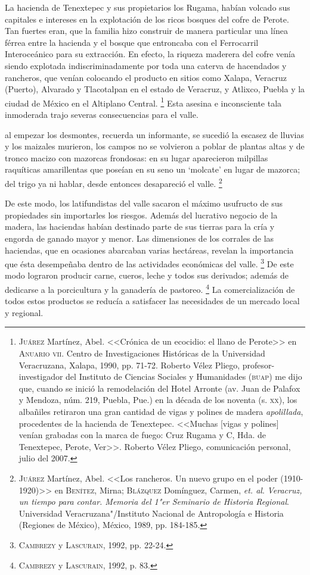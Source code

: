 \documentclass[14pt,twoside,final]{extbook} %
\let\oldfootnote\footnote
\renewcommand\footnote[1]{%
\oldfootnote{\hspace{1mm}#1}}
\begin{document}
La hacienda de Tenextepec y sus propietarios los Rugama, habían volcado sus capitales e intereses en la explotación de los ricos bosques del cofre de Perote. Tan fuertes eran, que la familia hizo construir de manera particular una línea férrea entre la hacienda y el bosque que entroncaba con el Ferrocarril Interoceánico para su extracción. En efecto, la riqueza maderera del cofre venía siendo explotada indiscriminadamente por toda una caterva de hacendados y rancheros, que venían colocando el producto en sitios como Xalapa, Veracruz (Puerto), Alvarado y Tlacotalpan en el estado de Veracruz,
y Atlixco, Puebla y la ciudad de México en el Altiplano Central.\footnote{\textsc{Juárez} Martínez, Abel. <<Crónica de un ecocidio: el llano de Perote>> en \textsc{Anuario vii}. Centro de Investigaciones Históricas de la Universidad Veracruzana, Xalapa, 1990, pp. 71-72. Roberto Vélez Pliego, profesor-investigador del Instituto de Ciencias Sociales y Humanidades (\textsc{buap}) me dijo que, cuando se inició la remodelación del Hotel Arronte (av. Juan de Palafox y Mendoza, núm. 219, Puebla, Pue.) en la década de los noventa (s. \textsc{xx}), los albañiles retiraron una gran cantidad de vigas y polines de madera \emph{apolillada}, procedentes de la hacienda de Tenextepec. <<Muchas [vigas y polines] venían grabadas con la marca de fuego: Cruz Rugama y C\textsu{ia}, Hda. de Tenextepec, Perote, Ver>>. Roberto Vélez Pliego, comunicación personal, julio del 2007.} Esta asesina e inconsciente tala inmoderada trajo severas consecuencias para el valle.
\begin{quoting}
al empezar los desmontes, recuerda un informante, se sucedió la escasez de lluvias y los maizales murieron, los campos no se volvieron a poblar de plantas altas y de tronco macizo con mazorcas frondosas: en su lugar aparecieron milpillas raquíticas amarillentas que poseían en su seno un
`molcate' en lugar de mazorca; del trigo ya ni hablar, desde entonces desapareció el valle.\footnote{\textsc{Juárez} Martínez, Abel. <<Los rancheros. Un nuevo grupo en el poder (1910-1920)>> en \textsc{Benítez}, Mirna; \textsc{Blázquez} Domínguez, Carmen, \emph{et. al}. \emph{Veracruz, un tiempo para contar. Memoria del 1"er Seminario de Historia Regional}. Universidad Veracruzana"/Instituto Nacional de Antropología e Historia (Regiones de México), México, 1989, pp. 184-185.}
\end{quoting}
De este modo, los latifundistas del valle sacaron el máximo usufructo de sus propiedades sin importarles los riesgos. Además del lucrativo negocio de la madera, las haciendas habían destinado parte de sus tierras para la cría y engorda de ganado mayor y menor. Las dimensiones de los corrales de las haciendas, que en ocasiones abarcaban varias hectáreas, revelan la importancia que ésta desempeñaba dentro de las actividades económicas del valle.\footnote{\textsc{Cambrezy} y \textsc{Lascurain}, 1992, pp. 22-24.} De este modo lograron producir carne, cueros, leche y todos sus
derivados; además de dedicarse a la porcicultura y la ganadería de pastoreo.\footnote{\textsc{Cambrezy} y \textsc{Lascurain}, 1992, p. 83.} La comercialización de todos estos productos se reducía a satisfacer las necesidades de un mercado local y regional.
\end{document}

